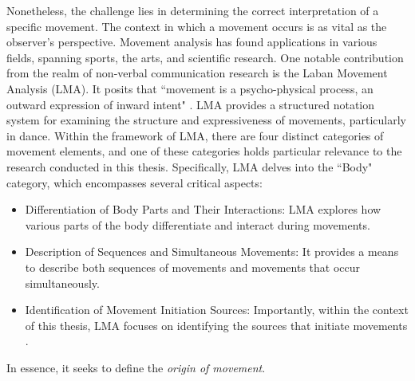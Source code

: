 Nonetheless, the challenge lies in determining the correct interpretation of a specific movement. 
The context in which a movement occurs is as vital as the observer's perspective. 
Movement analysis has found applications in various fields, spanning sports, the arts, and scientific research. 
One notable contribution from the realm of non-verbal communication research is the Laban Movement Analysis (LMA). 
It posits that “movement is a psycho-physical process, an outward expression of inward intent" \cite{Groff1995LabanMA}. 
LMA provides a structured notation system for examining the structure and expressiveness of movements, particularly in dance.
Within the framework of LMA, there are four distinct categories of movement elements, and one of these categories holds particular relevance to the research conducted in this thesis. 
Specifically, LMA delves into the “Body" category, which encompasses several critical aspects:
\begin{itemize}
    \item Differentiation of Body Parts and Their Interactions: LMA explores how various parts of the body differentiate and interact during movements.
    \item Description of Sequences and Simultaneous Movements: It provides a means to describe both sequences of movements and movements that occur simultaneously.  
    \item Identification of Movement Initiation Sources: Importantly, within the context of this thesis, LMA focuses on identifying the sources that initiate movements \cite{zhao2001synthesis}.
\end{itemize}
In essence, it seeks to define the \textit{origin of movement}.
    
